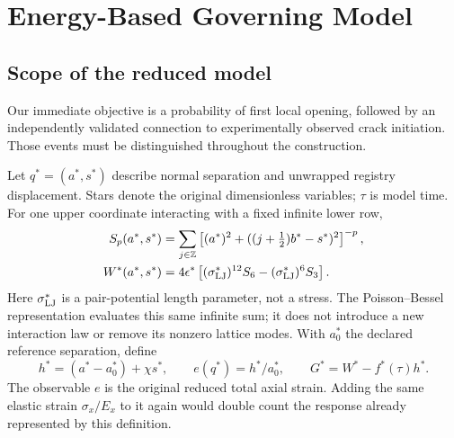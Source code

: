 \documentclass[11pt]{article}
\begin{document}
\section{Energy-Based Governing Model}
\subsection{Scope of the reduced model}
Our immediate objective is a probability of first local opening, followed by
an independently validated connection to experimentally observed crack initiation.
Those events must be distinguished throughout the construction.

Let $q^*=(a^*,s^*)$ describe normal separation and unwrapped registry displacement.
Stars denote the original dimensionless variables; $\tau$ is model time.
For one upper coordinate interacting with a fixed infinite lower row,
\begin{align}
 S_p(a^*,s^*)&=\sum_{j\in\mathbb Z}
 \left[(a^*)^2+((j+\tfrac12)b^*-s^*)^2\right]^{-p},\\
 W^*(a^*,s^*)&=4\epsilon^*
 \left[(\sigma_{\rm LJ}^*)^{12}S_6-(\sigma_{\rm LJ}^*)^6S_3\right].
\end{align}
Here $\sigma_{\rm LJ}^*$ is a pair-potential length parameter, not a stress.
The Poisson--Bessel representation evaluates this same infinite sum;
it does not introduce a new interaction law or remove its nonzero lattice modes.
With $a_0^*$ the declared reference separation, define
\begin{equation}
 h^*=(a^*-a_0^*)+\chi s^*,\qquad
 e(q^*)=h^*/a_0^*,\qquad G^*=W^*-f^*(\tau)h^*.
\end{equation}
The observable $e$ is the original reduced total axial strain.
Adding the same elastic strain $\sigma_x/E_x$ to it again would double count
the response already represented by this definition.
\end{document}
